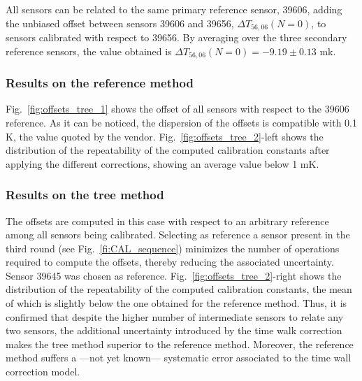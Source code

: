 All sensors can be related to the same primary reference sensor, 39606, adding  the unbiased offset between sensors 39606 and 39656,  $\Delta T_{56,06}(N=0)$, to sensors calibrated with respect to 39656. By averaging over the three secondary reference sensors, the value obtained is $\Delta T_{56,06}(N=0)=-9.19\pm0.13$ mk.

\subsubsection{Results on the reference method}
\label{sec:results_reference}
\noindent Fig.~\ref{fig:offsets_tree_1} shows the offset of all sensors with respect to the 39606 reference. As it can be noticed, the dispersion of the offsets is compatible with 0.1 K, the value quoted by the vendor. Fig.~\ref{fig:offsets_tree_2}-left shows the distribution of the repeatability of the computed calibration constants after applying the different corrections, showing an average value below 1 mK.

\subsubsection{Results on the tree method}
\noindent The offsets are computed in this case with respect to an arbitrary reference among all sensors being calibrated. Selecting as reference a sensor present in the third round (see Fig.~\ref{fi:CAL_sequence}) minimizes the number of operations required to compute the offsets, thereby reducing the associated uncertainty. Sensor 39645 was chosen as reference. Fig.~\ref{fig:offsets_tree_2}-right shows the distribution of the repeatability of the computed calibration constants, the mean of which is slightly below the one obtained for the reference method. Thus, it is confirmed that despite the higher number of intermediate sensors to relate any two sensors, the additional uncertainty introduced by the time walk correction makes the tree method superior to the reference method. Moreover, the reference method suffers a ---not yet known--- systematic error associated to the time wall correction model. 

